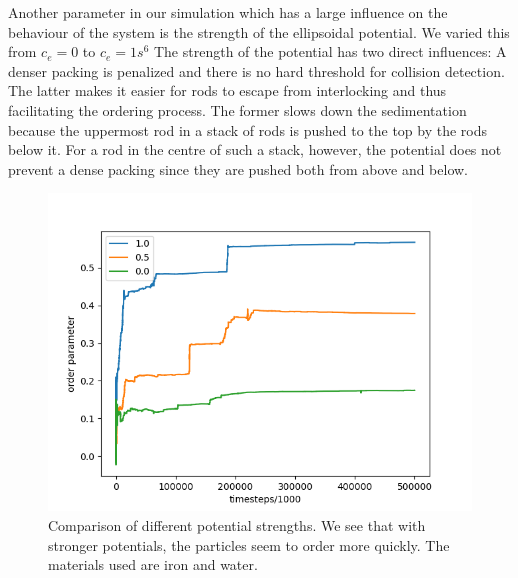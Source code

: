Another parameter in our simulation which has a large influence on the behaviour of the system is the strength of the ellipsoidal potential.
 We varied this from $c_e =0$ to $c_e=1s^6$
The strength of the potential has two direct influences: A denser packing is penalized and there is no hard threshold for collision detection.
The latter makes it easier for rods to escape from interlocking and thus facilitating the ordering process.
The former slows down the sedimentation
because the uppermost rod in a stack of rods is pushed to the top by the rods below it. For a rod
in the centre of such a stack, however, the potential does not prevent a dense packing since they
are pushed both from above and below.
\begin{figure}[h]
  \begin{minipage}[t]{0.75\textwidth}
     \hspace{-0.1\textwidth}
     \includegraphics[width=1.2\textwidth]{data/pot_comb_order_parameter_three.png}
  \end{minipage}
  \hfill
  \begin{minipage}[b]{0.2\textwidth}
  {\setcapindent{0pt} \caption{Comparison of different potential strengths. We see that with stronger potentials, the particles seem to order more quickly. The materials used are iron and water.}}
  \vspace{25 pt}
\end{minipage}
\label{fig:pot_comp}
\end{figure}
\clearpage

